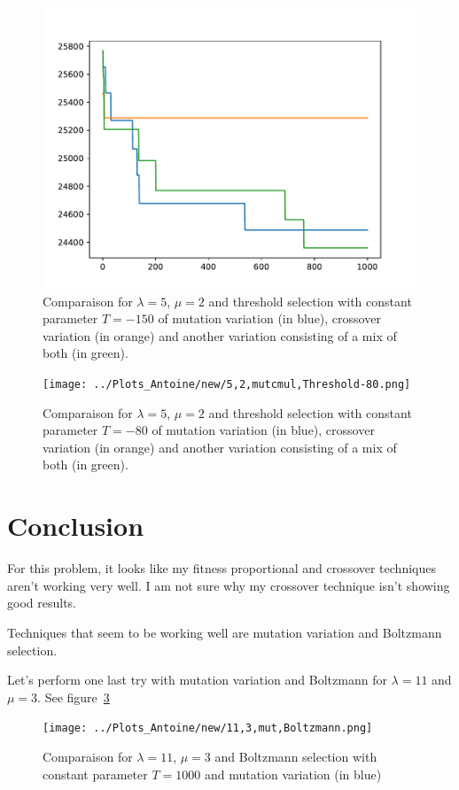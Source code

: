 \documentclass{article}
\theoremstyle{plain} %
\theoremstyle{definition} %
\begin{document}
\begin{center}
\begin{figure}
\centering
\includegraphics[scale=.6]{../Plots_Antoine/new/5,2,mutcmul,threshold-150.pdf}
\caption{Comparaison for $\lambda = 5$, $\mu = 2$ and threshold selection with
constant parameter $T = -150$ of mutation variation (in blue), crossover
variation (in orange) and another variation consisting of a mix of both (in
green).}
\label{Thresholdcomparevariation}
\end{figure}
\end{center}

\begin{figure}
\centering
\texttt{[image: ../Plots\_Antoine/new/5,2,mutcmul,Threshold-80.png]}
\caption{Comparaison for $\lambda = 5$, $\mu = 2$ and threshold selection with
constant parameter $T = -80$ of mutation variation (in blue), crossover
variation (in orange) and another variation consisting of a mix of both (in
green).}
\label{Threshold-80comparevariation}
\end{figure}
\section{Conclusion}

For this problem, it looks like my fitness proportional and crossover
techniques aren't working very well. I am not sure why my crossover technique
isn't showing good results.

Techniques that seem to be working well are mutation variation and Boltzmann
selection.

Let's perform one last try with mutation variation and Boltzmann for $\lambda
= 11 $ and $\mu = 3$. See figure~\ref{MutationBoltzmann}

\begin{figure}
\centering
\texttt{[image: ../Plots\_Antoine/new/11,3,mut,Boltzmann.png]}
\caption{Comparaison for $\lambda = 11$, $\mu = 3$ and Boltzmann selection with
constant parameter $T = 1000$ and mutation variation (in blue)}
\label{MutationBoltzmann}
\end{figure}
\end{document}
